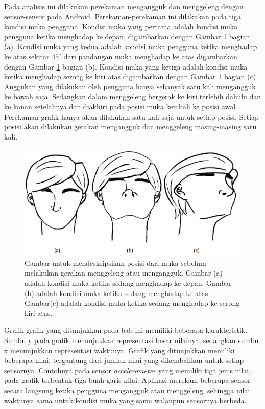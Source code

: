 Pada analisis ini dilakukan perekaman mengangguk dan menggeleng dengan sensor-sensor pada Android. Perekaman-perekaman ini dilakukan pada tiga kondisi muka pengguna. Kondisi muka yang pertama adalah kondisi muka pengguna ketika menghadap ke depan, digambarkan dengan Gambar \ref{fig:posisi-muka} bagian (a). Kondisi muka yang kedua adalah kondisi muka pengguna ketika menghadap ke atas sekitar $45^{\circ}$ dari pandangan muka menghadap ke atas digambarkan dengan Gambar \ref{fig:posisi-muka} bagian (b). Kondisi muka yang ketiga adalah kondisi muka ketika menghadap serong ke kiri atas digambarkan dengan Gambar \ref{fig:posisi-muka} bagian (c). Anggukan yang dilakukan oleh pengguna hanya sebanyak satu kali mengangguk ke bawah saja. Sedangkan dalam menggeleng bergerak ke kiri terlebih dahulu dan ke kanan setelahnya dan diakhiri pada posisi muka kembali ke posisi awal. Perekaman grafik hanya akan dilakukan satu kali saja untuk setiap posisi. Setiap posisi akan dilakukan gerakan mengangguk dan menggeleng masing-masing satu kali.

\begin{figure}[htbp]
\centering
\includegraphics[scale=0.4]{Gambar/posisi-muka.png}
\caption{Gambar untuk mendeskripsikan posisi dari muka sebelum melakukan gerakan menggeleng atau mengangguk. Gambar (a) adalah kondisi muka ketika sedang menghadap ke depan. Gambar (b) adalah kondisi muka ketika sedang menghadap ke atas. Gambar(c) adalah kondisi muka ketika sedang menghadap ke serong kiri atas.}
\label{fig:posisi-muka}
\end{figure}

Grafik-grafik yang ditunjukkan pada bab ini memiliki beberapa karakteristik. Sumbu y pada grafik menunjukkan representasi besar nilainya, sedangkan sumbu x menunjukkan representasi waktunya. Grafik yang ditunjukkan memiliki beberapa nilai, tergantung dari jumlah nilai yang dikembalikan untuk setiap sensornya. Contohnya pada sensor \textit{accelerometer} yang memiliki tiga jenis nilai, pada grafik terbentuk tiga buah garis nilai. Aplikasi merekam beberapa sensor secara langsung ketika pengguna mengangguk atau menggeleng, sehingga nilai waktunya sama untuk kondisi muka yang sama walaupun sensornya berbeda.

